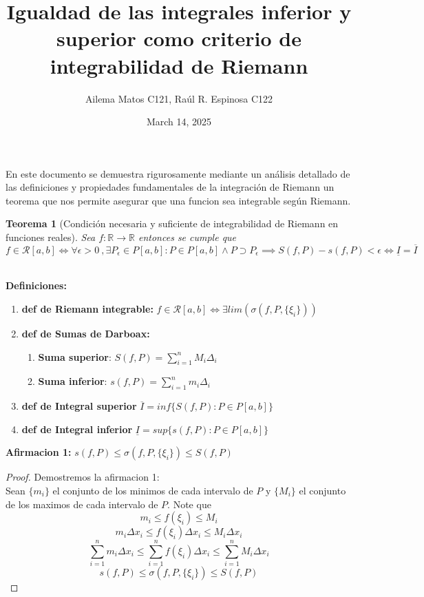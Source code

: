 \documentclass{article}
\title{Igualdad de las integrales inferior y superior como criterio de integrabilidad de Riemann}
\author{
Ailema Matos C121,
Raúl R. Espinosa C122 
}
\date{March 14, 2025}
\newtheorem{theorem}{Teorema}
\begin{document}
\maketitle

\section*{}

En este documento se demuestra rigurosamente mediante un análisis detallado de las definiciones y propiedades fundamentales de la integración de Riemann 
un teorema que nos permite asegurar que una funcion sea integrable según Riemann.\\

\begin{theorem}[Condición necesaria y suficiente de integrabilidad de Riemann en funciones reales]
Sea \( f: \mathbb{R} \to \mathbb{R} \) entonces se cumple que 
\[f \in \mathcal{R}[a, b] \Longleftrightarrow \forall \epsilon>0\ ,  \exists P_\epsilon \in P[a, b]: P \in P[a, b] \wedge P \supset P_\epsilon \implies S(f, P) - s(f, P) < \epsilon \Longleftrightarrow \underline{I} = \overline{I}\]\\
\end{theorem}

\textbf{Definiciones:}

\begin{enumerate}
   \item \textbf{def de Riemann integrable:} \(f \in \mathcal{R}[a, b] \Longleftrightarrow   \exists lim(\sigma(f, P,\{\xi_i\}))\)
    \item \textbf{def de Sumas de Darboax:} 
\begin{enumerate}
	\item \textbf{Suma superior}: \(S(f, P) = \sum_{i = 1}^{n} M_i\Delta_i\)
           \item \textbf{Suma inferior}: \(s(f,P) =\sum_{i = 1}^{n}m_i\Delta_i\)
\end{enumerate}
    \item \textbf{def de Integral superior}  \(\overline{I} = inf \{ S(f, P): P \in P[a, b] \} \)  
    \item \textbf{def de Integral inferior}  \(\underline{I} = sup\{ s(f, P): P \in P[a, b] \} \)
\end{enumerate} 
\textbf{Afirmacion 1:} \(s(f, P) \leq \sigma(f, P,\{\xi_i\}) \leq S(f, P)\)

\begin{proof}
Demostremos la afirmacion 1:\\

Sean \(\{m_i\}\) el conjunto de los minimos de cada intervalo de \(P\) y \(\{M_i\}\) el conjunto de los maximos de cada intervalo de \(P\).
Note que 
\[
m_i \leq f(\xi_i) \leq M_i
\]
\[
m_i \Delta x_i \leq f(\xi_i)\Delta x_i \leq M_i\Delta x_i
\] 
\[
\sum_{i = 1}^{n} m_i \Delta x_i \leq \sum_{i = 1}^{n} f(\xi_i)\Delta x_i \leq \sum_{i = 1}^{n} M_i\Delta x_i
\]
\[
s(f, P) \leq \sigma(f, P,\{\xi_i\}) \leq S(f, P)
\]
\end{proof}
\end{document}
